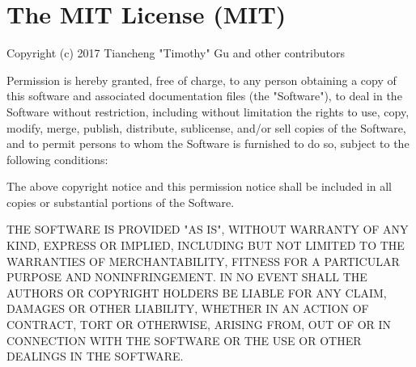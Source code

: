 \chapter{The MIT License (MIT)}
\hypertarget{md_node__modules_2w3c-hr-time_2LICENSE}{}\label{md_node__modules_2w3c-hr-time_2LICENSE}
\label{md_node__modules_2w3c-hr-time_2LICENSE_autotoc_md29300}%
%
 Copyright (c) 2017 Tiancheng "{}\+Timothy"{} Gu and other contributors

Permission is hereby granted, free of charge, to any person obtaining a copy of this software and associated documentation files (the "{}\+Software"{}), to deal in the Software without restriction, including without limitation the rights to use, copy, modify, merge, publish, distribute, sublicense, and/or sell copies of the Software, and to permit persons to whom the Software is furnished to do so, subject to the following conditions\+:

The above copyright notice and this permission notice shall be included in all copies or substantial portions of the Software.

THE SOFTWARE IS PROVIDED "{}\+AS IS"{}, WITHOUT WARRANTY OF ANY KIND, EXPRESS OR IMPLIED, INCLUDING BUT NOT LIMITED TO THE WARRANTIES OF MERCHANTABILITY, FITNESS FOR A PARTICULAR PURPOSE AND NONINFRINGEMENT. IN NO EVENT SHALL THE AUTHORS OR COPYRIGHT HOLDERS BE LIABLE FOR ANY CLAIM, DAMAGES OR OTHER LIABILITY, WHETHER IN AN ACTION OF CONTRACT, TORT OR OTHERWISE, ARISING FROM, OUT OF OR IN CONNECTION WITH THE SOFTWARE OR THE USE OR OTHER DEALINGS IN THE SOFTWARE. 
